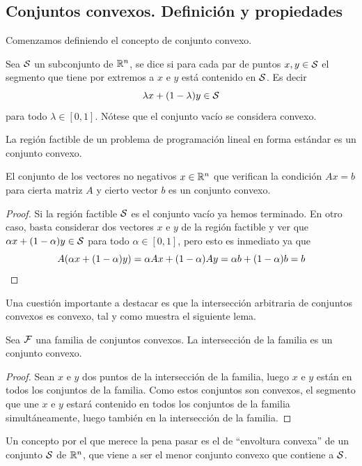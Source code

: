 \subsection{Conjuntos convexos. Definición y propiedades}
Comenzamos definiendo el concepto de conjunto convexo.
\begin{defi}[Convexos]
	Sea $\mathcal{S}$ un subconjunto de $\mathbb{R}^n$, se dice  si para cada par de puntos $x,y\in \mathcal{S}$ el segmento que tiene por extremos a $x$ e $y$ está contenido en $\mathcal{S}$. Es decir
	\begin{equation*}
		\lambda x + (1-\lambda)y\in\mathcal{S}
	\end{equation*}
	para todo $\lambda\in[0,1]$. Nótese que el conjunto vacío se considera convexo.
\end{defi}
La región factible de un problema de programación lineal en forma estándar es un conjunto convexo.
\begin{lem}
	El conjunto de los vectores no negativos $x\in\mathbb{R}^n$ que verifican la condición $Ax=b$ para cierta matriz $A$ y cierto vector $b$ es un conjunto convexo.
\end{lem}
\begin{proof}
	Si la región factible $\mathcal{S}$ es el conjunto vacío ya hemos terminado. En otro caso, basta considerar dos vectores $x$ e $y$ de la región factible y ver que $\alpha x + (1-\alpha) y\in \mathcal{S}$ para todo $\alpha\in[0,1]$, pero esto es inmediato ya que
	\begin{equation*}
		A(\alpha x + (1-\alpha) y)=\alpha Ax + (1-\alpha)Ay=\alpha b + (1-\alpha)b = b \qedhere
	\end{equation*}
\end{proof}

Una cuestión importante a destacar es que la intersección arbitraria de conjuntos convexos es convexo, tal y como muestra el siguiente lema.
\begin{lem}[Intersección]
	Sea $\mathcal{F}$ una familia de conjuntos convexos. La intersección de la familia es un conjunto convexo.
\end{lem}
\begin{proof}
	Sean $x$ e $y$ dos puntos de la intersección de la familia, luego $x$ e $y$ están en todos los conjuntos de la familia. Como estos conjuntos son convexos, el segmento que une $x$ e $y$ estará contenido en todos los conjuntos de la familia simultáneamente, luego también en la intersección de la familia.
\end{proof}
Un concepto por el que merece la pena pasar es el de ``envoltura convexa'' de un conjunto $\mathcal{S}$ de $\mathbb{R}^n$, que viene a ser el menor conjunto convexo que contiene a $\mathcal{S}$.

